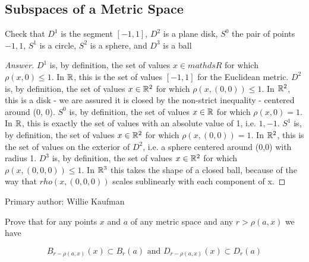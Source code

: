 \subsection{Subspaces of a Metric Space}
\begin{majorEx}%
Check that $D^1$ is the segment $[-1, 1]$, $D^2$ is a plane disk, $S^0$ the pair of points ${-1, 1}$, $S^1$ is a circle, $S^2$ is a sphere, and $D^3$ is a ball
\end{majorEx}
\begin{proof}[Answer]
$D^1$ is, by definition, the set of values $x \in mathds{R}$ for which $\rho (x, 0) \leq 1$. In $\mathbb{R}$, this is the set of values $[-1, 1]$ for the Euclidean metric.
$D^2$ is, by definition, the set of values $x \in \mathbb{R}^2$ for which $\rho (x, (0, 0)) \leq 1$. In $\mathbb{R}^2$, this is a disk - we are assured it is closed by the non-strict inequality - centered around (0, 0).
$S^0$ is, by definition, the set of values $x \in \mathbb{R}$ for which $\rho (x, 0) = 1$. In $\mathbb{R}$, this is exactly the set of values with an absolute value of 1, i.e. ${1, -1}$.
$S^1$ is, by definition, the set of values $x \in \mathbb{R}^2$ for which $\rho (x, (0, 0)) = 1$. In $\mathbb{R}^2$, this is the set of values on the exterior of $D^2$, i.e. a sphere centered around (0,0) with radius 1.
$D^3$ is, by definition, the set of values $x \in \mathbb{R}^2$ for which $\rho (x, (0, 0, 0)) \leq 1$. In $\mathbb{R}^3$ this takes the shape of a closed ball, because of the way that $rho (x, (0, 0, 0))$ scales sublinearly with each component of x.
\end{proof}

Primary author: Willie Kaufman

\begin{majorEx}%
  Prove that for any points $x$ and $a$ of any metric space and any $r
  > \rho(a,x)$ we have

  $$B_{r-\rho(a,x)}(x) \subset B_r(a) \text{  and  }
  D_{r-\rho(a,x)}(x) \subset D_r(a)$$
\end{majorEx}

